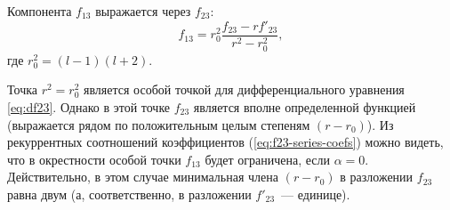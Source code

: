 \documentclass[\docroot/report.tex]{subfiles}
\begin{document}
Компонента $f_{13}$ выражается через $f_{23}$:
%
\begin{equation}\label{eq:f13-through-f23}
    f_{13} = r_0^2 \frac{ f_{23} - r f'_{23} }{ r^2 - r_0^2 } ,
\end{equation}
%
где $r_0^2 = (l-1)(l+2)$.

Точка $r^2 = r_0^2$ является особой точкой для дифференциального уравнения \autoref{eq:df23}. Однако в этой точке $f_{23}$ является вполне определенной функцией (выражается рядом по положительным целым степеням $(r-r_0)$). Из рекуррентных соотношений коэффициентов (\autoref{eq:f23-series-coefs}) можно видеть, что в окрестности особой точки $f_{13}$ будет ограничена, если $\alpha =0$. Действительно, в этом случае минимальная члена $(r-r_0)$ в разложении $f_{23}$ равна двум (а, соответственно, в разложении $f'_{23}$~--- единице).
\end{document}
